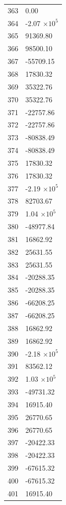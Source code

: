 \documentclass[a4paper,11pt]{article}
\begin{document}
\begin{center}
\begin{longtable}{|R{1.5cm}|R{2.6cm}|}
  363 &         0.00 \\
  364 &        -2.07 $\times 10^{           5}$ \\
  365 &     91369.80 \\
  366 &     98500.10 \\
  367 &    -55709.15 \\
  368 &     17830.32 \\
  369 &     35322.76 \\
  370 &     35322.76 \\
  371 &    -22757.86 \\
  372 &    -22757.86 \\
  373 &    -80838.49 \\
  374 &    -80838.49 \\
  375 &     17830.32 \\
  376 &     17830.32 \\
 {\color{red} 377} & {\color{red}       -2.19 $\times 10^{           5}$}\\
  378 &     82703.67 \\
  379 &         1.04 $\times 10^{           5}$ \\
  380 &    -48977.84 \\
  381 &     16862.92 \\
  382 &     25631.55 \\
  383 &     25631.55 \\
  384 &    -20288.35 \\
  385 &    -20288.35 \\
  386 &    -66208.25 \\
  387 &    -66208.25 \\
  388 &     16862.92 \\
  389 &     16862.92 \\
  390 &        -2.18 $\times 10^{           5}$ \\
  391 &     83562.12 \\
  392 &         1.03 $\times 10^{           5}$ \\
  393 &    -49731.32 \\
  394 &     16915.40 \\
  395 &     26770.65 \\
  396 &     26770.65 \\
  397 &    -20422.33 \\
  398 &    -20422.33 \\
  399 &    -67615.32 \\
  400 &    -67615.32 \\
  401 &     16915.40 \\

\end{longtable}
\end{center}
\end{document}

